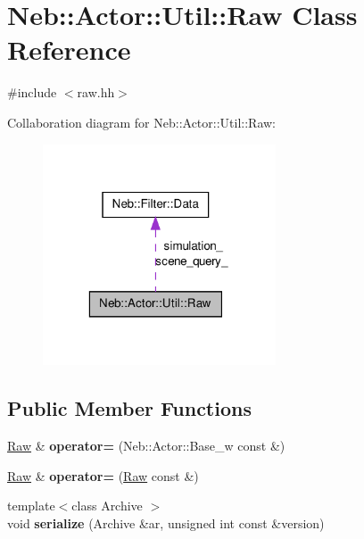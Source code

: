 \hypertarget{classNeb_1_1Actor_1_1Util_1_1Raw}{\section{\-Neb\-:\-:\-Actor\-:\-:\-Util\-:\-:\-Raw \-Class \-Reference}
\label{classNeb_1_1Actor_1_1Util_1_1Raw}
}


{\ttfamily \#include $<$raw.\-hh$>$}



\-Collaboration diagram for \-Neb\-:\-:\-Actor\-:\-:\-Util\-:\-:\-Raw\-:\nopagebreak
\begin{figure}[H]
\begin{center}
\leavevmode
\includegraphics[width=196pt]{classNeb_1_1Actor_1_1Util_1_1Raw__coll__graph}
\end{center}
\end{figure}
\subsection*{\-Public \-Member \-Functions}
\begin{DoxyCompactItemize}
\item 
\hypertarget{classNeb_1_1Actor_1_1Util_1_1Raw_a40bc87aaaccadc6ffc449eeff796e2a6}{\hyperlink{classNeb_1_1Actor_1_1Util_1_1Raw}{\-Raw} \& {\bfseries operator=} (\-Neb\-::\-Actor\-::\-Base\-\_\-w const \&)}\label{classNeb_1_1Actor_1_1Util_1_1Raw_a40bc87aaaccadc6ffc449eeff796e2a6}

\item 
\hypertarget{classNeb_1_1Actor_1_1Util_1_1Raw_a8c4b27f90d4128a7fc6758f2b4605d22}{\hyperlink{classNeb_1_1Actor_1_1Util_1_1Raw}{\-Raw} \& {\bfseries operator=} (\hyperlink{classNeb_1_1Actor_1_1Util_1_1Raw}{\-Raw} const \&)}\label{classNeb_1_1Actor_1_1Util_1_1Raw_a8c4b27f90d4128a7fc6758f2b4605d22}

\item 
\hypertarget{classNeb_1_1Actor_1_1Util_1_1Raw_aa18bcb6b2c4a468e3cc393ad20fff990}{{\footnotesize template$<$class Archive $>$ }\\void {\bfseries serialize} (\-Archive \&ar, unsigned int const \&version)}\label{classNeb_1_1Actor_1_1Util_1_1Raw_aa18bcb6b2c4a468e3cc393ad20fff990}

\end{DoxyCompactItemize}
